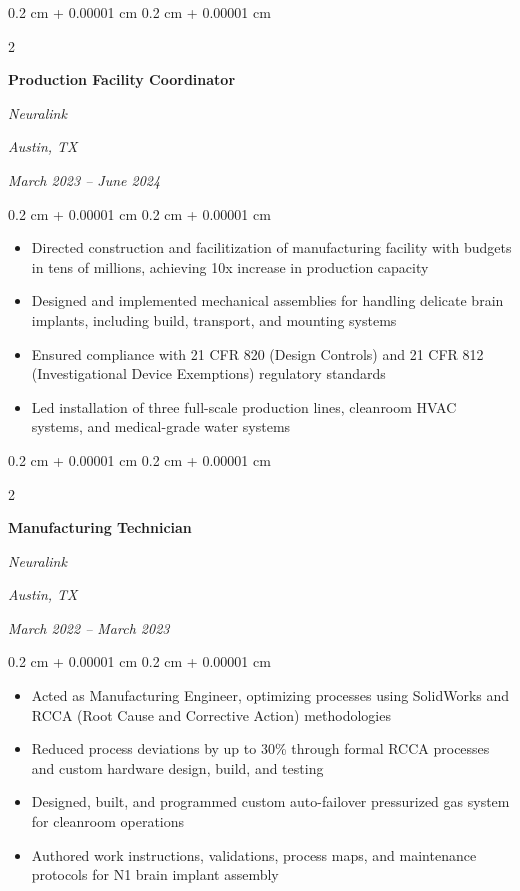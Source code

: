 \documentclass[10pt, letterpaper]{article}
\newenvironment{highlights}{
    \begin{itemize}[
        topsep=0.10 cm,
        parsep=0.10 cm,
        partopsep=0pt,
        itemsep=0pt,
        leftmargin=0.4 cm + 10pt
    ]
}{
    \end{itemize}
} %
\newenvironment{onecolentry}{
    \begin{adjustwidth}{
        0.2 cm + 0.00001 cm
    }{
        0.2 cm + 0.00001 cm
    }
}{
    \end{adjustwidth}
} %
\newenvironment{twocolentry}[2][]{
    \onecolentry
    \def\secondColumn{#2}
    \setcolumnwidth{\fill, 9.0 cm}
    \begin{paracol}{2}
}{
    \switchcolumn \raggedleft \secondColumn
    \end{paracol}
    \endonecolentry
} %
\begin{document}
        \vspace{0.35 cm}

        \begin{twocolentry}{
        \textit{Austin, TX}    
            
        \textit{March 2023 – June 2024}}
            \textbf{Production Facility Coordinator}
            
            \textit{Neuralink}
        \end{twocolentry}

        \vspace{0.10 cm}
        \begin{onecolentry}
            \begin{highlights}
                \item Directed construction and facilitization of manufacturing facility with budgets in tens of millions, achieving 10x increase in production capacity
                \item Designed and implemented mechanical assemblies for handling delicate brain implants, including build, transport, and mounting systems
                \item Ensured compliance with 21 CFR 820 (Design Controls) and 21 CFR 812 (Investigational Device Exemptions) regulatory standards
                \item Led installation of three full-scale production lines, cleanroom HVAC systems, and medical-grade water systems
            \end{highlights}
        \end{onecolentry}

        \vspace{0.35 cm}

        \begin{twocolentry}{
        \textit{Austin, TX}    
            
        \textit{March 2022 – March 2023}}
            \textbf{Manufacturing Technician}
            
            \textit{Neuralink}
        \end{twocolentry}

        \vspace{0.10 cm}
        \begin{onecolentry}
            \begin{highlights}
                \item Acted as Manufacturing Engineer, optimizing processes using SolidWorks and RCCA (Root Cause and Corrective Action) methodologies
                \item Reduced process deviations by up to 30\% through formal RCCA processes and custom hardware design, build, and testing
                \item Designed, built, and programmed custom auto-failover pressurized gas system for cleanroom operations
                \item Authored work instructions, validations, process maps, and maintenance protocols for N1 brain implant assembly
            \end{highlights}
        \end{onecolentry}
\end{document}
